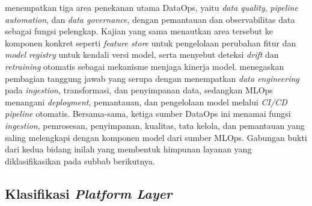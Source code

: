 \textcite{rella2022mlops} menempatkan tiga area penekanan utama DataOps, yaitu \textit{data quality}, \textit{pipeline automation}, dan \textit{data governance}, dengan pemantauan dan observabilitas data sebagai fungsi pelengkap. Kajian yang sama menautkan area tersebut ke komponen konkret seperti \textit{feature store} untuk pengelolaan perubahan fitur dan \textit{model registry} untuk kendali versi model, serta menyebut deteksi \textit{drift} dan \textit{retraining} otomatis sebagai mekanisme menjaga kinerja model. \textcite{jain2025integrating} menegaskan pembagian tanggung jawab yang serupa dengan menempatkan \textit{data engineering} pada \textit{ingestion}, transformasi, dan penyimpanan data, sedangkan MLOps menangani \textit{deployment}, pemantauan, dan pengelolaan model melalui \textit{CI/CD pipeline} otomatis. Bersama-sama, ketiga sumber DataOps ini menamai fungsi \textit{ingestion}, pemrosesan, penyimpanan, kualitas, tata kelola, dan pemantauan yang saling melengkapi dengan komponen model dari sumber MLOps. Gabungan bukti dari kedua bidang inilah yang membentuk himpunan layanan yang diklasifikasikan pada subbab berikutnya.

\subsection{Klasifikasi \textit{Platform Layer}}
\label{subsec:klasifikasi-layanan}


